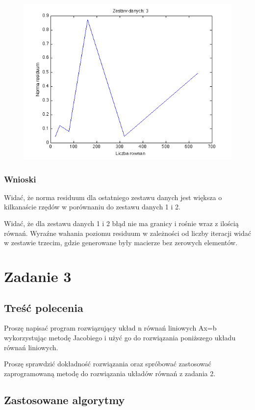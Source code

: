 \documentclass[11pt]{article} %
\begin{document}
\begin{figure}
\includegraphics{zestaw3}
\end{figure}

\subsubsection{Wnioski}

Widać, że norma residuum dla ostatniego zestawu danych jest większa o kilkanaście rzędów w porównaniu do zestawu danych 1 i 2.

Widać, że dla zestawu danych 1 i 2 błąd nie ma granicy i rośnie wraz z ilością równań.
Wyraźne wahania poziomu residuum w zależności od liczby iteracji widać w zestawie trzecim, gdzie generowane były macierze bez zerowych elementów.

\section{Zadanie 3}

\subsection{Treść polecenia}

Proszę napisać program rozwiązujący układ n równań liniowych Ax=b wykorzystując metodę Jacobiego i użyć go do rozwiązania poniższego układu równań liniowych.

Proszę sprawdzić dokładność rozwiązania oraz spróbować zastosować zaprogramowaną metodę do rozwiązania układów równań z zadania 2.

\subsection{Zastosowane algorytmy}
\end{document}
